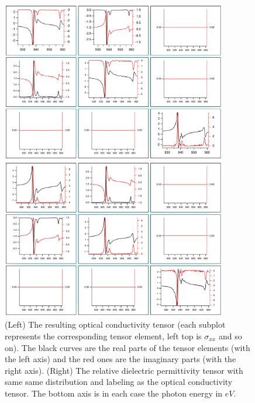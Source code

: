 \documentclass[twocolumn,amsmath,superscriptaddress,amssymb]{revtex4-1}
\begin{document}
\begin{figure}
	\begin{minipage}[b]{0.95\columnwidth}
		\includegraphics[width = \textwidth, height = 7cm]{OptCond.pdf}
	\end{minipage}
	\hspace{8mm}
	\begin{minipage}[b]{0.95\columnwidth}
		\includegraphics[width = \textwidth, height = 7cm]{DielTens.pdf}
	\end {minipage}
	\caption{\label{OpticalCond} (Left) The resulting optical conductivity tensor (each subplot represents the corresponding tensor element, left top is $\sigma_{xx}$ and so on). The black curves are the real parts of the tensor elements (with the left axis) and the red ones are the imaginary parts (with the right axis). (Right) The relative dielectric permittivity tensor with same same distribution and labeling as the optical conductivity tensor. The bottom axis is in each case the photon energy in $eV$.}
\end{figure}
%
\end{document}
